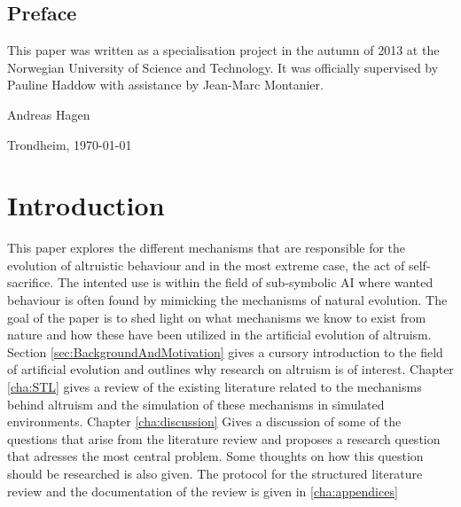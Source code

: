 \documentclass[a4paper]{book}
\newcommand{\thesisAuthor}{Andreas Hagen}
\begin{document}

\clearpage

\section*{Preface}



\vspace{1cm}

This paper was written as a specialisation project in the autumn of 2013 at the Norwegian University of Science and Technology. It was officially supervised by Pauline Haddow with assistance by Jean-Marc Montanier.

\vfill

\hfill \thesisAuthor

\hfill Trondheim, \today

\clearpage

\tableofcontents



\mainmatter

\chapter{Introduction}
\label{cha:Introduction}

This paper explores the different mechanisms that are responsible for the evolution of altruistic behaviour and in the most extreme case, the act of self-sacrifice.
The intented use is within the field of sub-symbolic AI where wanted behaviour is often found by mimicking the mechanisms of natural evolution. 
The goal of the paper is to shed light on what mechanisms we know to exist from nature and how these have been utilized in the artificial evolution of altruism.
Section \ref{sec:BackgroundAndMotivation} gives a cursory introduction to the field of artificial evolution and outlines why research on altruism is of interest.
Chapter \ref{cha:STL} gives a review of the existing literature related to the mechanisms behind altruism and the simulation of these mechanisms in simulated 
environments. Chapter \ref{cha:discussion} Gives a discussion of some of the questions that arise from the literature review and proposes a research question
that adresses the most central problem. Some thoughts on how this question should be researched is also given. The protocol for the structured literature review and the documentation of the review is given in \ref{cha:appendices}
\end{document}
